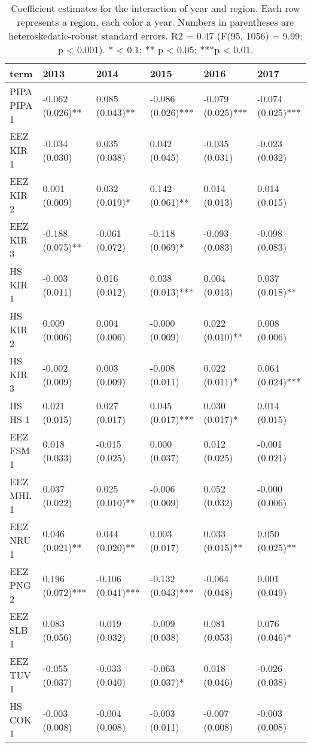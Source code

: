 \documentclass[11pt,]{article}
\begin{document}
\begin{table}

\caption{\label{tab:unnamed-chunk-27}\label{tab:mean_change}Coefficient estimates for the interaction of year and region. Each row represents a region, each color a year. Numbers in parentheses are heteroskedatic-robust standard errors. R2 = 0.47 (F(95, 1056) = 9.99; p < 0.001). * < 0.1; ** p < 0.05; ***p < 0.01.}
\centering
\begin{tabular}[t]{llllll}
\toprule
term & 2013 & 2014 & 2015 & 2016 & 2017\\
\midrule
PIPA PIPA 1 & -0.062 (0.026)** & 0.085 (0.043)** & -0.086 (0.026)*** & -0.079 (0.025)*** & -0.074 (0.025)***\\
EEZ KIR 1 & -0.034 (0.030) & 0.035 (0.038) & 0.042 (0.045) & -0.035 (0.031) & -0.023 (0.032)\\
EEZ KIR 2 & 0.001 (0.009) & 0.032 (0.019)* & 0.142 (0.061)** & 0.014 (0.013) & 0.014 (0.015)\\
EEZ KIR 3 & -0.188 (0.075)** & -0.061 (0.072) & -0.118 (0.069)* & -0.093 (0.083) & -0.098 (0.083)\\
HS KIR 1 & -0.003 (0.011) & 0.016 (0.012) & 0.038 (0.013)*** & 0.004 (0.013) & 0.037 (0.018)**\\
\addlinespace
HS KIR 2 & 0.009 (0.006) & 0.004 (0.006) & -0.000 (0.009) & 0.022 (0.010)** & 0.008 (0.006)\\
HS KIR 3 & -0.002 (0.009) & 0.003 (0.009) & -0.008 (0.011) & 0.022 (0.011)* & 0.064 (0.024)***\\
HS HS 1 & 0.021 (0.015) & 0.027 (0.017) & 0.045 (0.017)*** & 0.030 (0.017)* & 0.014 (0.015)\\
EEZ FSM 1 & 0.018 (0.033) & -0.015 (0.025) & 0.000 (0.037) & 0.012 (0.025) & -0.001 (0.021)\\
EEZ MHL 1 & 0.037 (0.022) & 0.025 (0.010)** & -0.006 (0.009) & 0.052 (0.032) & -0.000 (0.006)\\
\addlinespace
EEZ NRU 1 & 0.046 (0.021)** & 0.044 (0.020)** & 0.003 (0.017) & 0.033 (0.015)** & 0.050 (0.025)**\\
EEZ PNG 2 & 0.196 (0.072)*** & -0.106 (0.041)*** & -0.132 (0.043)*** & -0.064 (0.048) & 0.001 (0.049)\\
EEZ SLB 1 & 0.083 (0.056) & -0.019 (0.032) & -0.009 (0.038) & 0.081 (0.053) & 0.076 (0.046)*\\
EEZ TUV 1 & -0.055 (0.037) & -0.033 (0.040) & -0.063 (0.037)* & 0.018 (0.046) & -0.026 (0.038)\\
HS COK 1 & -0.003 (0.008) & -0.004 (0.008) & -0.003 (0.011) & -0.007 (0.008) & -0.003 (0.008)\\
\bottomrule
\end{tabular}
\end{table}
\end{document}
